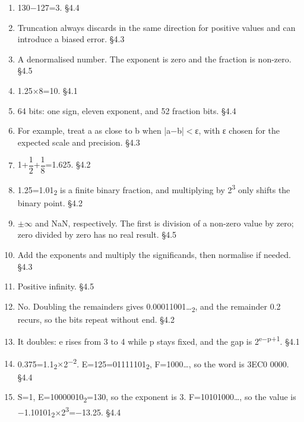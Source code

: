 \documentclass[11pt]{article}
\begin{document}
\begin{keepsection}
\begin{enumerate}
\item 130\ensuremath{-}127=3. \hfill{\small\color{FAUblue}§4.4}
\item Truncation always discards in the same direction for positive values and can introduce a biased error. \hfill{\small\color{FAUblue}§4.3}
\item A denormalised number. The exponent is zero and the fraction is non-zero. \hfill{\small\color{FAUblue}§4.5}
\item 1.25\ensuremath{\times}8=10. \hfill{\small\color{FAUblue}§4.1}
\item 64 bits: one sign, eleven exponent, and 52 fraction bits. \hfill{\small\color{FAUblue}§4.4}
\item For example, treat a as close to b when |a\ensuremath{-}b|\ensuremath{<}ε, with ε chosen for the expected scale and precision. \hfill{\small\color{FAUblue}§4.3}
\item 1+{\small\ensuremath{\dfrac{1}{2}}}+{\small\ensuremath{\dfrac{1}{8}}}=1.625. \hfill{\small\color{FAUblue}§4.2}
\item 1.25=1.01\textsubscript{2} is a finite binary fraction, and multiplying by 2\textsuperscript{3} only shifts the binary point. \hfill{\small\color{FAUblue}§4.2}
\item \ensuremath{\pm}\ensuremath{\infty} and NaN, respectively. The first is division of a non-zero value by zero; zero divided by zero has no real result. \hfill{\small\color{FAUblue}§4.5}
\item Add the exponents and multiply the significands, then normalise if needed. \hfill{\small\color{FAUblue}§4.3}
\item Positive infinity. \hfill{\small\color{FAUblue}§4.5}
\item No. Doubling the remainders gives 0.00011001…\textsubscript{2}, and the remainder 0.2 recurs, so the bits repeat without end. \hfill{\small\color{FAUblue}§4.2}
\item It doubles: e rises from 3 to 4 while p stays fixed, and the gap is 2\textsuperscript{e\ensuremath{-}p+1}. \hfill{\small\color{FAUblue}§4.1}
\item 0.375=1.1\textsubscript{2}\ensuremath{\times}2\textsuperscript{\ensuremath{-}2}. E=125=01111101\textsubscript{2}, F=1000…, so the word is 3EC0 0000. \hfill{\small\color{FAUblue}§4.4}
\item S=1, E=10000010\textsubscript{2}=130, so the exponent is 3. F=10101000…, so the value is \ensuremath{-}1.10101\textsubscript{2}\ensuremath{\times}2\textsuperscript{3}=\ensuremath{-}13.25. \hfill{\small\color{FAUblue}§4.4}
\end{enumerate}

\end{keepsection}
\end{document}
